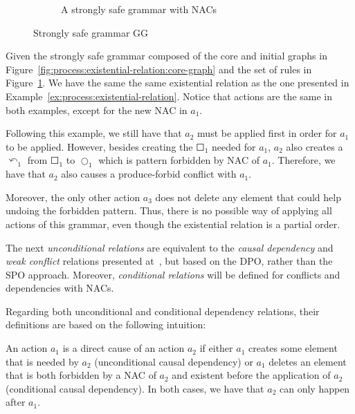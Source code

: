\begin{example}
\begin{figure}[!ht]
\begin{subfigure}[t]{.5\textwidth}
    \caption{A strongly safe grammar with NACs}\label{fig:process:existential-relation:example-nacs}
  \end{subfigure}
  \caption{Strongly safe grammar GG}\label{fig:process:existential-relation}
\end{figure}
\end{example}


\begin{example}\label{ex:process:existential-relation-fail}Given the strongly safe grammar composed of the core and initial graphs in Figure~\ref{fig:process:existential-relation:core-graph} and the set of rules in Figure~\ref{fig:process:existential-relation:example-nacs}. We have the same the same existential relation as the one presented in Example~\ref{ex:process:existential-relation}. Notice that actions are the same in both examples, except for the
  new NAC in $a_1$.

  Following this example, we still have that $a_2$ must be applied first in order for $a_1$ to be applied. However, besides creating the $\Square_1$ needed for $a_1$, $a_2$ also creates a $\curvearrowleft_1$ from $\Square_1$ to $\Circle_1$ which is pattern forbidden by NAC of $a_1$. Therefore, we have that $a_2$ also causes a produce-forbid conflict with $a_1$.

  Moreover, the only other action $a_3$ does not delete any element that could help undoing the forbidden pattern. Thus, there is no possible way of applying all actions of this grammar, even though the existential relation is a partial order.

\end{example}

The next \emph{unconditional relations} are equivalent to the \emph{causal dependency} and \emph{weak conflict} relations presented at~\cite{Ribeiro1996}, but based on the DPO, rather than the SPO approach. Moreover, \emph{conditional relations} will be defined for conflicts and dependencies with NACs.

Regarding both unconditional and conditional dependency relations, their definitions are based on the following intuition:

\begin{intuition} An action $a_1$ is a direct cause of an action $a_2$ if either $a_1$ creates some element that is needed by $a_2$ (unconditional causal dependency) or $a_1$ deletes an element that is both forbidden by a NAC of $a_2$ and existent before the application of $a_2$ (conditional causal dependency). In both cases, we have that $a_2$ can only happen after $a_1$. 
\end{intuition}

